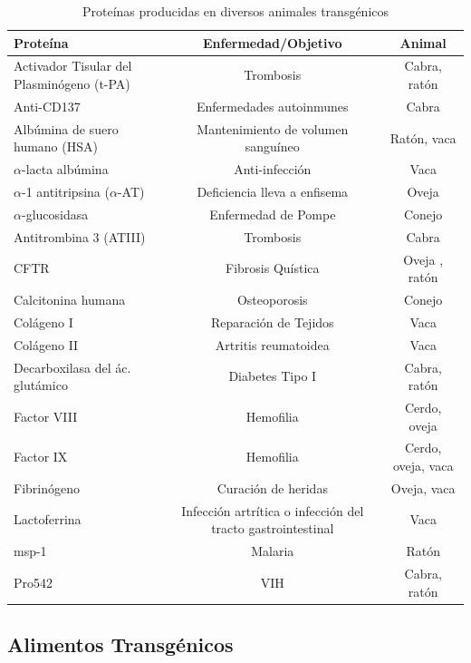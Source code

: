 \documentclass[fleqn,10pt]{SelfArx} %
\begin{document}
\begin{table}[t!]
\centering
\begin{tabular}{|l|c|c|} \hline
\textbf{Proteína} & \textbf{Enfermedad/Objetivo} & \textbf{Animal} \\ \hline
Activador Tisular del Plasminógeno (t-PA) &Trombosis & Cabra, ratón \\ \hline
Anti-CD137 & Enfermedades autoinmunes & Cabra \\ \hline
Albúmina de suero humano (HSA) & Mantenimiento de volumen sanguíneo & Ratón, vaca \\ \hline
$\alpha$-lacta albúmina & Anti-infección & Vaca \\ \hline
$\alpha$-1 antitripsina ($\alpha$-AT) & Deficiencia lleva a enfisema & Oveja \\ \hline
$\alpha$-glucosidasa & Enfermedad de Pompe & Conejo \\ \hline
Antitrombina 3 (ATIII) & Trombosis & Cabra \\ \hline
CFTR & Fibrosis Quística & Oveja , ratón \\ \hline
Calcitonina humana & Osteoporosis & Conejo \\ \hline
Colágeno I & Reparación de Tejidos & Vaca \\ \hline
Colágeno II & Artritis reumatoidea & Vaca \\ \hline
Decarboxilasa del ác. glutámico & Diabetes Tipo I & Cabra, ratón \\ \hline
Factor VIII & Hemofilia & Cerdo, oveja \\ \hline
Factor IX & Hemofilia & Cerdo, oveja, vaca \\ \hline
Fibrinógeno & Curación de heridas & Oveja, vaca \\ \hline
Lactoferrina & Infección artrítica o infección del tracto gastrointestinal & Vaca \\ \hline
msp-1 & Malaria & Ratón \\ \hline
Pro542 & VIH & Cabra, ratón \\ \hline
\end{tabular}

\caption{Proteínas producidas en diversos animales transgénicos \cite{Koszarycz2004, niemann2007transgenic, houdebine2009production}}
\label{cuadro1}
\end{table}


\subsection{Alimentos Transgénicos}
\end{document}
